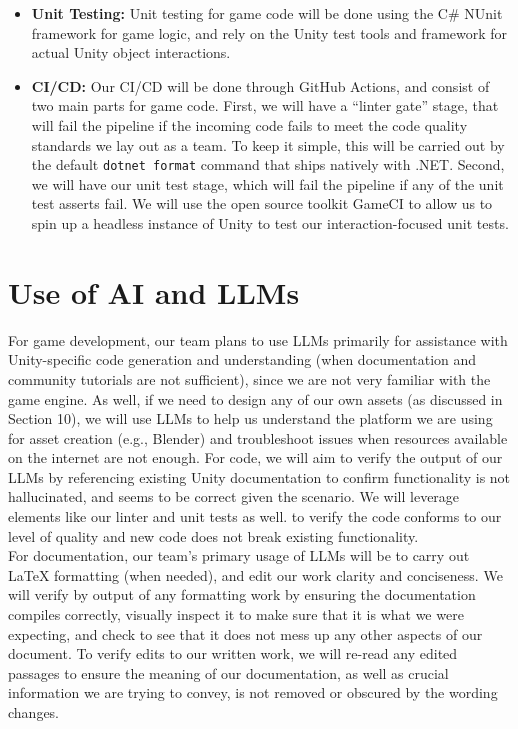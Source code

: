 \documentclass{article}
\begin{document}
\begin{itemize}
    \item \textbf{Unit Testing:} Unit testing for game code will be done using the C\# NUnit framework for game logic,
    and rely on the Unity test tools and framework for actual Unity object interactions.

    \item \textbf{CI/CD:} Our CI/CD will be done through GitHub Actions, and consist of two main parts for game code. First,
    we will have a “linter gate” stage, that will fail the pipeline if the incoming code fails to meet the code quality standards
    we lay out as a team. To keep it simple, this will be carried out by the default \texttt{dotnet format} command that ships
    natively with .NET. Second, we will have our unit test stage, which will fail the pipeline if any of the unit test asserts fail.
    We will use the open source toolkit GameCI to allow us to spin up a headless instance of Unity to test our interaction-focused unit tests.
\end{itemize}

\section{Use of AI and LLMs}

For game development, our team plans to use LLMs primarily for assistance with Unity-specific code generation and
understanding (when documentation and community tutorials are not sufficient), since we are not very familiar with the
game engine. As well, if we need to design any of our own assets (as discussed in Section 10), we will use LLMs to help
us understand the platform we are using for asset creation (e.g., Blender) and troubleshoot issues when resources available
on the internet are not enough. For code, we will aim to verify the output of our LLMs by referencing existing Unity
documentation to confirm functionality is not hallucinated, and seems to be correct given the scenario. We will leverage
elements like our linter and unit tests as well. to verify the code conforms to our level of quality and new code does not
break existing functionality.\\

For documentation, our team's primary usage of LLMs will be to carry out \LaTeX{} formatting (when needed), and edit our work
clarity and conciseness. We will verify by output of any formatting work by ensuring the documentation compiles correctly,
visually inspect it to make sure that it is what we were expecting, and check to see that it does not mess up any other
aspects of our document. To verify edits to our written work, we will re-read any edited passages to ensure the meaning of
our documentation, as well as crucial information we are trying to convey, is not removed or obscured by the wording changes.\\
\end{document}
